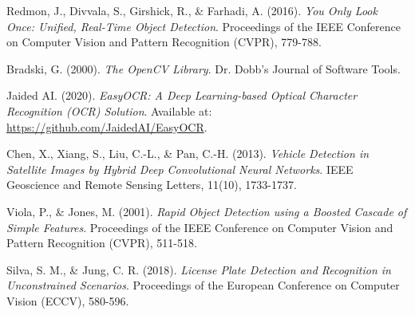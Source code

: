 \documentclass[conference]{IEEEtran}
\begin{document}
\begin{thebibliography}{99}

Redmon, J., Divvala, S., Girshick, R., \& Farhadi, A. (2016). 
\textit{You Only Look Once: Unified, Real-Time Object Detection}. 
Proceedings of the IEEE Conference on Computer Vision and Pattern Recognition (CVPR), 779-788.

Bradski, G. (2000). 
\textit{The OpenCV Library}. 
Dr. Dobb’s Journal of Software Tools.

Jaided AI. (2020). 
\textit{EasyOCR: A Deep Learning-based Optical Character Recognition (OCR) Solution}. 
Available at: \url{https://github.com/JaidedAI/EasyOCR}.

Chen, X., Xiang, S., Liu, C.-L., \& Pan, C.-H. (2013). 
\textit{Vehicle Detection in Satellite Images by Hybrid Deep Convolutional Neural Networks}. 
IEEE Geoscience and Remote Sensing Letters, 11(10), 1733-1737.

Viola, P., \& Jones, M. (2001). 
\textit{Rapid Object Detection using a Boosted Cascade of Simple Features}. 
Proceedings of the IEEE Conference on Computer Vision and Pattern Recognition (CVPR), 511-518.

Silva, S. M., \& Jung, C. R. (2018). 
\textit{License Plate Detection and Recognition in Unconstrained Scenarios}. 
Proceedings of the European Conference on Computer Vision (ECCV), 580-596.

\end{thebibliography}
\end{document}
